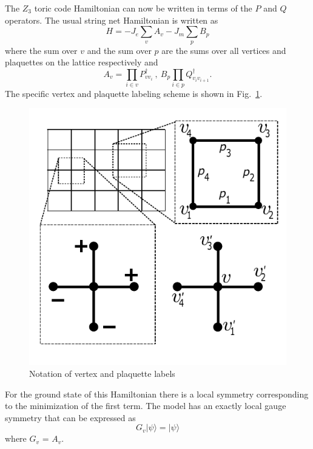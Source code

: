 \documentclass[twocolumn,prb,aps,floatfix,superscriptaddress]{revtex4-1}
\begin{document}
        The $Z_3$ toric code Hamiltonian can now be written in terms of the $P$ and $Q$ operators. The
        usual string net Hamiltonian is written as 
        \begin{equation}
            H = - J_e \sum_v A_v - J_m \sum_p B_p
        \end{equation}
        where the sum over $v$ and the sum over $p$ are the sums over all vertices and plaquettes on
        the lattice respectively and 
        \begin{equation}
            A_v = \prod_{i\in v} P^\dagger_{vv_i}~,~ B_p \prod_{i\in p} Q^\dagger_{v_iv_{i+1}}
            .
        \end{equation}
        The specific vertex and plaquette labeling scheme is shown in Fig.~\ref{fig:vertex_link_labels}.
        \begin{figure}[htpb]
            \centering
            \includegraphics[width=0.8\linewidth]{vertex_link_gauge_def}
            \caption{Notation of vertex and plaquette labels}
            \label{fig:vertex_link_labels}
        \end{figure}
        For the ground state of this Hamiltonian there is a local symmetry corresponding to the
        minimization of the first term. The model has an exactly local gauge symmetry that can be
        expressed as
        \begin{equation}
            G_v | \psi \rangle= | \psi \rangle
        \end{equation}
        where $G_v$ = $A_v$.
\end{document}
